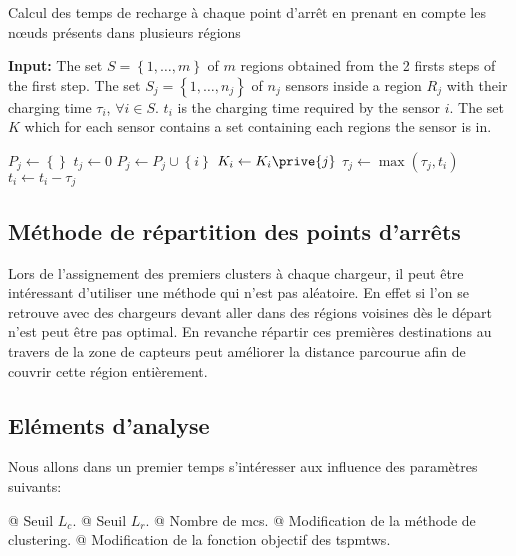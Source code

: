 \documentclass[noposter,final]{polytech/polytech}
\begin{document}
			\begin{algorithm}[H]
				\caption{Calcul des temps de recharge à chaque point d'arrêt en prenant en compte les n\oe uds présents dans plusieurs régions}
  				\label{alg:algorithm1}
  				\hspace*{\algorithmicindent} \textbf{Input:}
  				The set $S=\left\{1,\dots, m\right\}$ of $m$ regions obtained from the 2 firsts steps of the first step. The set $S_j=\left\{1,\dots ,n_j\right\}$ of $n_j$ sensors inside a region $R_j$ with their charging time $\tau_i$, $\forall i\in S$. $t_i$ is the charging time required by the sensor $i$. The set $K$ which for each sensor contains a set containing each regions the sensor is in.
				\begin{algorithmic}[1]
						\State $P_j\leftarrow \left\{\right\}$
						\State $t_j\leftarrow 0$
								\State $P_j\leftarrow P_j\cup\left\{ i\right\}$
								\State $K_i \leftarrow K_i\prive{j}$
							\Else
								\State $\tau_j \leftarrow \max\left( \tau_j, t_i\right)$
							\EndIf
						\EndFor
							\State $t_i\leftarrow t_i - \tau_j$
						\EndFor
					\EndFor
				\end{algorithmic}
			\end{algorithm}
			 

		\subsection{Méthode de répartition des points d'arrêts}
			Lors de l'assignement des premiers clusters à chaque chargeur, il peut être intéressant d'utiliser une méthode qui n'est pas aléatoire.
			En effet si l'on se retrouve avec des chargeurs devant aller dans des régions voisines dès le départ n'est peut être pas optimal.
			En revanche répartir ces premières destinations au travers de la zone de capteurs peut améliorer la distance parcourue afin de couvrir cette région entièrement.
		
		\subsection{Eléments d'analyse}
			Nous allons dans un premier temps s'intéresser aux influence des paramètres suivants:
			\begin{easylist}
				@ Seuil $L_c$.
				@ Seuil $L_r$.
				@ Nombre de \glspl{mc}.
				@ Modification de la méthode de clustering.
				@ Modification de la fonction objectif des \glspl{tspmtw}.
			\end{easylist}
			
\end{document}
